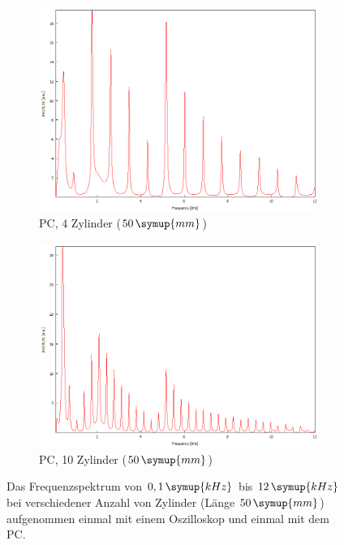 \begin{figure}
\begin{subfigure}[b]{0.3\textwidth}
        \includegraphics[width=\textwidth]{data/1_2zylinder50mmPC/4.png}
        \caption{PC, 4 Zylinder ($50 \, \symup{mm}$)}
    \end{subfigure}
    \hfill
    \begin{subfigure}[b]{0.3\textwidth}
        \centering
        \includegraphics[width=\textwidth]{data/1_2zylinder50mmPC/10.png}
        \caption{PC, 10 Zylinder ($50 \, \symup{mm}$)}
    \end{subfigure}
       \caption{Das Frequenzspektrum von $0,1 \, \symup{kHz}$ bis $12 \, \symup{kHz}$ bei verschiedener Anzahl von Zylinder (Länge $50 \, \symup{mm}$) aufgenommen einmal mit einem Oszilloskop und einmal mit dem PC.}
       \label{fig:blub1}
\end{figure}

